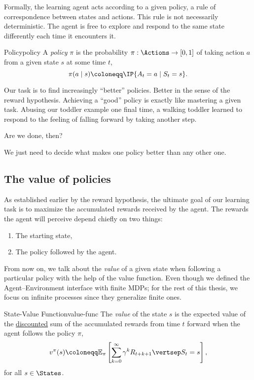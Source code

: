 Formally, the learning agent acts according to a given policy, a rule of
correspondence between states and actions. This rule is not necessarily
deterministic. The agent is free to explore and respond to the same state
differently each time it encounters it.

\begin{dfn}{Policy}{policy}
	A \emph{policy} $\pi$ is the probability $\pi: \Actions \to [0,1]$ of taking
	action $a$ from a given state $s$ at some time $t$,
	\begin{equation*}
		\pi(a \mid s) \coloneqq \IP{A_t = a \mid S_t = s}.
	\end{equation*}
\end{dfn}

Our task is to find increasingly ``better'' policies. Better in the sense of the
reward hypothesis. Achieving a ``good'' policy is exactly like mastering a given
task. Abusing our toddler example one final time, a walking toddler learned to
respond to the feeling of falling forward by taking another step.

Are we done, then? 

We just need to decide what makes one policy better than any other one.

\subsection{The value of policies}
As established earlier by the reward hypothesis, the ultimate goal of our
learning task is to maximize the accumulated rewards received by the agent. The
rewards the agent will perceive depend chiefly on two things:
\begin{enumerate}
	\item The starting state,
	\item The policy followed by the agent.
\end{enumerate}

From now on, we talk about the \textit{value} of a given state when following a
particular policy with the help of the value function. Even though we defined
the Agent--Environment interface with finite MDPs; for the rest of this thesis,
we focus on infinite processes since they generalize finite ones.

\begin{dfn}{State-Value Function}{value-func}
	The \emph{value} of the state $s$ is the expected value of the
	\underline{discounted} sum of the accumulated rewards from time $t$ forward
	when the agent follows the policy $\pi$,
	\begin{equation*}
		v^{\pi} (s) \coloneqq \mathbb{E}_{\pi} \left[\sum_{k=0}^{\infty} \gamma^{k} R_{t+k+1} \vertsep S_{t} = s\right],
	\end{equation*}
	for all $s \in \States$.
\end{dfn}

